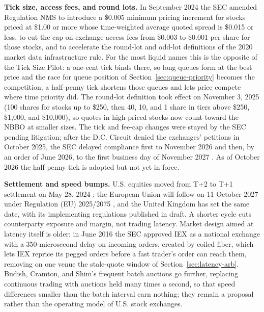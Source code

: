 \documentclass[../ai_in_finance]{subfiles}
\begin{document}
\textbf{Tick size, access fees, and round lots.} In September 2024 the SEC amended Regulation NMS \parencite{sec2024nmstick} to introduce a \$0.005 minimum pricing increment for stocks priced at \$1.00 or more whose time-weighted average quoted spread is \$0.015 or less, to cut the cap on exchange access fees from \$0.003 to \$0.001 per share for those stocks, and to accelerate the round-lot and odd-lot definitions of the 2020 market data infrastructure rule. For the most liquid names this is the opposite of the Tick Size Pilot: a one-cent tick binds there, so long queues form at the best price and the race for queue position of Section~\ref{sec:queue-priority} becomes the competition; a half-penny tick shortens those queues and lets price compete where time priority did. The round-lot definition took effect on November 3, 2025 (100 shares for stocks up to \$250, then 40, 10, and 1 share in tiers above \$250, \$1{,}000, and \$10{,}000), so quotes in high-priced stocks now count toward the NBBO at smaller sizes. The tick and fee-cap changes were stayed by the SEC pending litigation; after the D.C. Circuit denied the exchanges' petitions in October 2025, the SEC delayed compliance first to November 2026 and then, by an order of June 2026, to the first business day of November 2027 \parencite{sec2026tickrelief}. As of October 2026 the half-penny tick is adopted but not yet in force.

\textbf{Settlement and speed bumps.} U.S. equities moved from T+2 to T+1 settlement on May 28, 2024 \parencite{sec2023t1}; the European Union will follow on 11 October 2027 under Regulation (EU) 2025/2075 \parencite{eu2025t1}, and the United Kingdom has set the same date, with its implementing regulations published in draft. A shorter cycle cuts counterparty exposure and margin, not trading latency. Market design aimed at latency itself is older: in June 2016 the SEC approved IEX as a national exchange \parencite{sec2016iex} with a 350-microsecond delay on incoming orders, created by coiled fiber, which lets IEX reprice its pegged orders before a fast trader's order can reach them, removing on one venue the stale-quote window of Section~\ref{sec:latency-arb}. Budish, Cramton, and Shim's frequent batch auctions \parencite{budish2015high} go further, replacing continuous trading with auctions held many times a second, so that speed differences smaller than the batch interval earn nothing; they remain a proposal rather than the operating model of U.S. stock exchanges.
\end{document}
